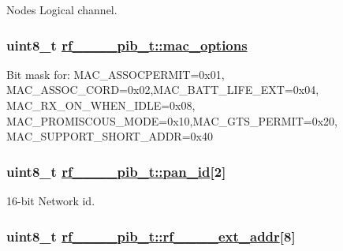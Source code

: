 Nodes Logical channel. \hypertarget{structrf__802__15__4__pib__t_ea80646f1870b4a766d8859c8d335d3f}{
\subsubsection[mac\_\-options]{\setlength{\rightskip}{0pt plus 5cm}uint8\_\-t \hyperlink{structrf__802__15__4__pib__t_ea80646f1870b4a766d8859c8d335d3f}{rf\_\_\_\_\-pib\_\-t::mac\_\-options}}}
\label{structrf__802__15__4__pib__t_ea80646f1870b4a766d8859c8d335d3f}


Bit mask for: MAC\_\-ASSOCPERMIT=0x01, MAC\_\-ASSOC\_\-CORD=0x02,MAC\_\-BATT\_\-LIFE\_\-EXT=0x04, MAC\_\-RX\_\-ON\_\-WHEN\_\-IDLE=0x08, MAC\_\-PROMISCOUS\_\-MODE=0x10,MAC\_\-GTS\_\-PERMIT=0x20, MAC\_\-SUPPORT\_\-SHORT\_\-ADDR=0x40 \hypertarget{structrf__802__15__4__pib__t_a3a25fd64e439278076803b8649074c1}{
\subsubsection[pan\_\-id]{\setlength{\rightskip}{0pt plus 5cm}uint8\_\-t \hyperlink{structrf__802__15__4__pib__t_a3a25fd64e439278076803b8649074c1}{rf\_\_\_\_\-pib\_\-t::pan\_\-id}\mbox{[}2\mbox{]}}}
\label{structrf__802__15__4__pib__t_a3a25fd64e439278076803b8649074c1}


16-bit Network id. \hypertarget{structrf__802__15__4__pib__t_ada75ac4d0156c4b98bafee8b33447d6}{
\subsubsection[rf\_\-802\_\-15\_\-4\_\-ext\_\-addr]{\setlength{\rightskip}{0pt plus 5cm}uint8\_\-t \hyperlink{structrf__802__15__4__pib__t_ada75ac4d0156c4b98bafee8b33447d6}{rf\_\_\_\_\-pib\_\-t::rf\_\_\_\_\-ext\_\-addr}\mbox{[}8\mbox{]}}}
\label{structrf__802__15__4__pib__t_ada75ac4d0156c4b98bafee8b33447d6}


